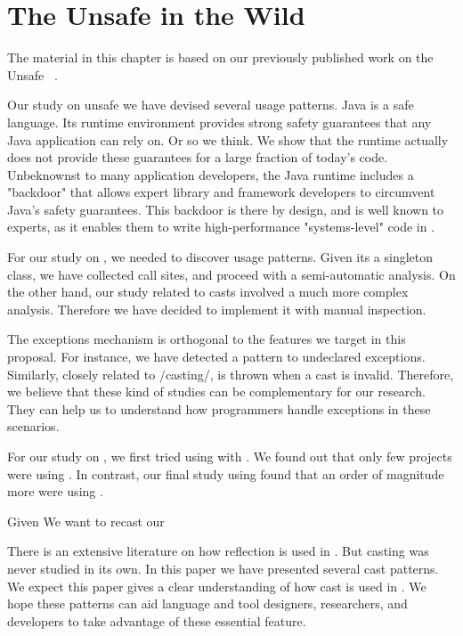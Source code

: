 
\chapter{The \java{} Unsafe \api{} in the Wild}
\label{cha:unsafe}

The material in this chapter is based on our previously published work on the Unsafe \api{}~\cite{mastrangeloUseYourOwn2015}.

Our study on unsafe we have devised several usage patterns.
Java is a safe language.
Its runtime environment provides strong safety guarantees that any Java application can rely on.
Or so we think.
We show that the runtime actually does not provide these guarantees for a large fraction of today's \java{} code.
Unbeknownst to many application developers, the Java runtime includes a "backdoor" that allows expert library and framework developers to circumvent Java's safety guarantees.
This backdoor is there by design, and is well known to experts, as it enables them to write high-performance "systems-level" code in \java{}.

For our study on \smu{}, we needed to discover usage patterns.
Given its a singleton class, we have collected call sites, and proceed with a semi-automatic analysis.
On the other hand, our study related to casts involved a much more complex analysis.
Therefore we have decided to implement it with manual inspection.

The exceptions mechanism is orthogonal to the features we target in this proposal.
For instance, we have detected a \smu{} pattern to \throw{} undeclared exceptions.
Similarly, closely related to /casting/, \cce{} is thrown when a cast is invalid.
Therefore, we believe that these kind of studies can be complementary for our research.
They can help us to understand how programmers handle exceptions in these scenarios.

For our study on \smu{}, we first tried using \boa{} with \sourceforge{}.
We found out that only few projects were using \smu{}.
In contrast, our final study using \maven{} found that an order of magnitude more were using \smu{}.

Given 
We want to recast our 



There is an extensive literature on how reflection is used in \java{}.
But casting was never studied in its own.
In this paper we have presented several cast patterns.
We expect this paper gives a clear understanding of how cast is used in \java{}.
We hope these patterns can aid language and tool designers,
researchers, and developers to take advantage of these essential feature.